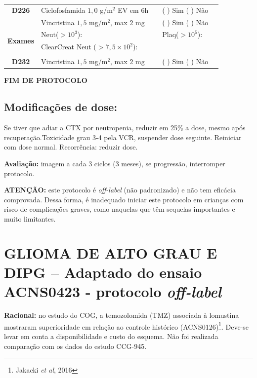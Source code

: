 \documentclass[11pt,a4paper,oldfontcommands]{memoir}
\begin{document}
\begin{center}
\begin{longtable}{p{1cm}p{5cm}|p{1cm}|p{4cm}|p{2.5cm}}
    \multicolumn{1}{c|}{\multirow{1}{*}{\textbf{D226}}}&{Ciclofosfamida \(1,0\) g/m\(^2\) EV em 6h}&&{(  ) Sim (  ) Não}&\\
    \multicolumn{1}{c|}{\multirow{1}{*}{\textbf{}}}&{Vincristina \(1,5\) mg/m\(^2\), max \(2\) mg}&&{(  ) Sim (  ) Não}&\\
    \hline
    \multicolumn{1}{c|}{\multirow{2}{*}{\textbf{Exames}}}&\multicolumn{2}{l|}{Neut(\(>10^3\)):}&{Plaq(\(>10^5\)):}&\\
    \cline{2-5}
    \multicolumn{1}{c|}{\multirow{2}{*}{{}}}&\multicolumn{2}{l|}{ClearCreat Neut (\(>7,5\times10^2\)):}&{}&{}\\
    \hline
    \\
    \hline
    \multicolumn{1}{c|}{\multirow{1}{*}{\textbf{D232}}}&{Vincristina \(1,5\) mg/m\(^2\), max \(2\) mg}&&{(  ) Sim (  ) Não}&\\
    \hline
\end{longtable}
\textbf{FIM DE PROTOCOLO}

\end{center}
\subsection{Modificações de dose:}
Se tiver que adiar a CTX por neutropenia, reduzir em 25\% a dose, mesmo após recuperação.Toxicidade grau 3-4 pela VCR, suspender dose seguinte. Reiniciar com dose normal. Recorrência: reduzir dose.

\textbf{Avaliação:} imagem a cada 3 ciclos (3 meses), se progressão, interromper protocolo.

\textbf{ATENÇÃO:} este protocolo é \textit{off-label} (não padronizado) e não tem eficácia comprovada. Dessa forma, é inadequado iniciar este protocolo em crianças com risco de complicações graves, como naquelas que têm sequelas importantes e muito limitantes.

\cleardoublepage

\section{GLIOMA DE ALTO GRAU E DIPG -- Adaptado do ensaio ACNS0423 - protocolo \textit{off-label}}
{\let\thefootnote\relax{}}
\textbf{Racional:} no estudo do COG, a temozolomida (TMZ) associada à lomustina mostraram superioridade em relação ao controle histórico (ACNS0126)\footnote{Jakacki \textit{et al}, 2016}. Deve-se levar em conta a disponibilidade e custo do esquema. Não foi realizada comparação com os dados do estudo CCG-945.
\end{document}
